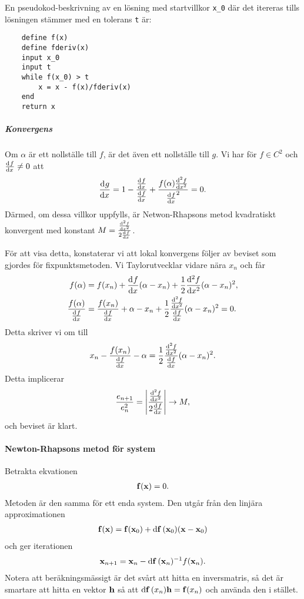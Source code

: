 En pseudokod-beskrivning av en lösning med startvillkor \verb|x_0| där det itereras tills lösningen stämmer med en tolerans \verb|t| är:
\begin{lstlisting}
	define f(x)
	define fderiv(x)
	input x_0
	input t
	while f(x_0) > t
		x = x - f(x)/fderiv(x)
	end
	return x
\end{lstlisting}

\subparagraph{Konvergens}
Om $\alpha$ är ett nollställe till $f$, är det även ett nollställe till $g$. Vi har för $f\in C^{2}$ och $\dv[]{f}{x} (\alpha) \neq 0$ att
\begin{align*}
	\dv[]{g}{x} (\alpha) = 1 - \frac{\dv[]{f}{x} (\alpha)}{\dv[]{f}{x} (\alpha)} + \frac{f(\alpha)\dv[2]{f}{x} (\alpha)}{\dv[]{f}{x} (\alpha)^{2}} = 0.
\end{align*}
Därmed, om dessa villkor uppfylls, är Netwon-Rhapsons metod kvadratiskt konvergent med konstant $M = \frac{\dv[2]{f}{x} (\alpha)}{2\dv[]{f}{x} (\alpha)}$.

För att visa detta, konstaterar vi att lokal konvergens följer av beviset som gjordes för fixpunktsmetoden. Vi Taylorutvecklar vidare nära $x_{n}$ och får
\begin{align*}
	f(\alpha)                            &= f(x_{n}) + \dv[]{f}{x} (x_{n})(\alpha - x_{n}) + \frac{1}{2}\dv[2]{f}{x} (c_{n})(\alpha - x_{n})^{2}, \\
	\frac{f(\alpha)}{\dv[]{f}{x} (x_{n})} &= \frac{f(x_{n})}{\dv[]{f}{x} (x_{n})} + \alpha - x_{n} + \frac{1}{2}\frac{\dv[2]{f}{x} (c_{n})}{\dv[]{f}{x} (x_{n})}(\alpha - x_{n})^{2} = 0.
\end{align*}
Detta skriver vi om till
\begin{align*}
	x_{n} - \frac{f(x_{n})}{\dv[]{f}{x} (x_{n})} - \alpha = \frac{1}{2}\frac{\dv[2]{f}{x} (c_{n})}{\dv[]{f}{x} (x_{n})}(\alpha - x_{n})^{2}.
\end{align*}
Detta implicerar
\begin{align*}
	\frac{e_{n + 1}}{e_{n}^{2}} = \abs{\frac{\dv[2]{f}{x} (c_{n})}{2\dv[]{f}{x} (x_{n})}} \to M,
\end{align*}
och beviset är klart.

\paragraph{Newton-Rhapsons metod för system}
Betrakta ekvationen
\begin{align*}
	\vb{f}(\vb{x}) = 0.
\end{align*}
Metoden är den samma för ett enda system. Den utgår från den linjära approximationen
\begin{align*}
	\vb{f}(\vb{x}) = \vb{f}(\vb{x}_{0}) + \dd{\vb{f}}(\vb{x}_{0})(\vb{x} - \vb{x}_{0})
\end{align*}
och ger iterationen
\begin{align*}
	\vb{x}_{n + 1} = \vb{x}_{n} - \dd{\vb{f}}(\vb{x}_{n})^{-1}f(\vb{x}_{n}).
\end{align*}
Notera att beräkningsmässigt är det svårt att hitta en inversmatris, så det är smartare att hitta en vektor $\vb{h}$ så att $\dd{\vb{f}}(x_{n})\vb{h} = \vb{f}(x_{n})$ och använda den i stället.

